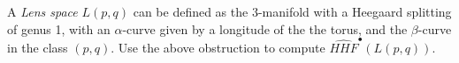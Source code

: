 

        A \emph{Lens space} $L(p,q)$ can be defined as the $3$-manifold with a Heegaard splitting of genus 1, with an $\alpha$-curve given by a longitude of the the torus, and the $\beta$-curve in the class $(p, q)$. Use the above obstruction to compute $\widehat{HHF}^\bullet(L(p,q))$.
        

